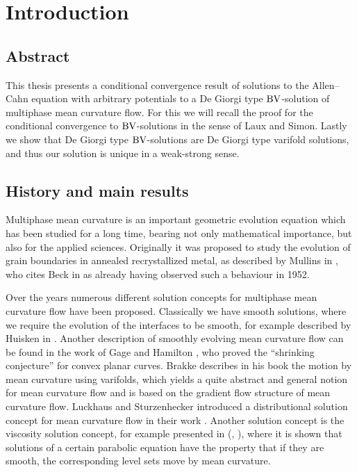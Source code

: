 \chapter{Introduction}

\section{Abstract}

This thesis presents a conditional convergence result of solutions to the 
Allen--Cahn equation with arbitrary potentials to a De Giorgi type $ \operatorname{BV} 
$-solution of multiphase mean 
curvature flow. For this we will recall the proof for the conditional 
convergence to $ \operatorname{BV} $-solutions in 
the sense of Laux and Simon. Lastly we show that De Giorgi type $ \operatorname{BV} 
$-solutions are De Giorgi type varifold solutions, and thus our solution 
is unique in a weak-strong sense.

\section{History and main results}

Multiphase mean curvature is an important geometric evolution equation which 
has been studied for a long time, bearing not only mathematical importance, but 
also for the applied sciences. Originally it was proposed to study the 
evolution of grain boundaries in annealed recrystallized metal, as described by
Mullins in \cite{mullins_two_dimensional_motion_of_idealized_grain_boundaries}, 
who cites Beck in \cite{beck_metal_interfaces} as already having observed such 
a behaviour in 1952. 

Over the years numerous different solution concepts for multiphase mean 
curvature flow have been proposed. Classically we have smooth solutions, where 
we require the evolution of the interfaces to be smooth, for example described 
by Huisken 
in \cite{huisken_asymptotic_behavior_for_singuliarities_of_mcf}. 
Another description of smoothly evolving mean curvature flow can be found in 
the work of Gage and Hamilton 
\cite{gage_hamilton_the_heat_equation_shrinking_convex_plane_curves}, who 
proved the \enquote{shrinking conjecture} for convex planar curves.
Brakke describes in his book 
\cite{brakke_kenneth_motion_of_surface_by_mean_curvature} the motion by mean 
curvature using varifolds, which yields a quite abstract and general notion for 
mean curvature flow and is based on the gradient flow structure of mean 
curvature flow. 
Luckhaus and Sturzenhecker introduced a 
distributional solution concept for mean curvature flow in their work 
\cite{luckhaus_sturzenhecker_implicit_time_discretization_for_mcf}. Another 
solution concept is the viscosity solution concept, for example presented in 
(\cite{chen_giga_goto_uniqueness_and_existence_of_generalized_mcf_equations},
\cite{evans_spruck_motion_of_level_sets_by_mean_curvature}), where it is shown 
that solutions of a certain parabolic equation have the property that if they 
are smooth, the corresponding level sets move by mean curvature.

